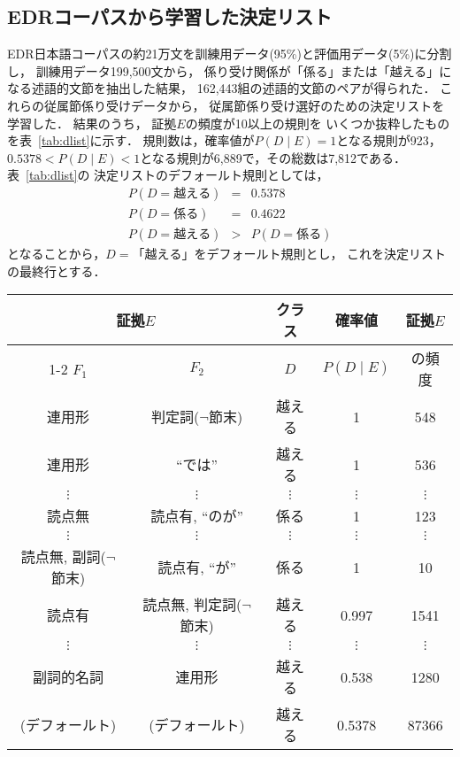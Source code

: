 \subsection{EDRコーパスから学習した決定リスト}

EDR日本語コーパスの約21万文を訓練用データ(95\%)と評価用データ(5\%)に分割し，
訓練用データ199,500文から，
係り受け関係が「係る」または「越える」になる述語的文節を抽\mbox{出した結果}，
162,443組の述語的文節のペアが得られた．
これらの従属節係り受けデータから，
従属節係り受け選好のための決定リストを学習した．
結果のうち，
証拠$E$の頻度が10以上の規則を
いくつか抜粋したものを表~\ref{tab:dlist}に示す．
規則数は，確率値が$P(D\mid E)\!=\!1$となる規則が923，
$0.5378\!<\!P(D\mid E)\!<\!1$となる規則が6,889で，その総数は7,812である．
表~\ref{tab:dlist}の
\mbox{決定リストのデ}フォールト規則としては，
\begin{eqnarray*}
  P(D\!=\!越える) & = & 0.5378 \\
  P(D\!=\!係る) & = & 0.4622 \\
  P(D\!=\!越える) & > & P(D\!=\!係る)
\end{eqnarray*}
となることから，$D\!=\!「越える」$をデフォールト規則とし，
これを決定リストの最終行とする．


\begin{table*}
  \begin{center}
	\caption{EDRコーパスから学習した決定リスト中の規則\\(証拠$E$の頻度10以上)の抜粋}
	\label{tab:dlist}
	\vspace*{.1cm}
\hspace*{-1cm}
    \begin{tabular}[c]{|c|c|c|c|c|}   \hline
	\multicolumn{2}{|c|}{証拠$E$} &	 クラス & 確率値 & 証拠$E$ \\ \cline{1-2}
	$F_1$ & $F_2$ & $D$ & $P(D\mid E)$ & の頻度 \\ \hline\hline
	連用形 & 判定詞($\neg$節末) & 越える & 1 & 548 \\
	連用形 & ``では'' & 越える & 1 & 536 \\
	$\vdots$ & $\vdots$ & $\vdots$ & $\vdots$ & $\vdots$ \\
	読点無 & 読点有, ``のが'' & 係る & 1 & 123 \\	
	$\vdots$ & $\vdots$ & $\vdots$ & $\vdots$ & $\vdots$ \\
	読点無, 副詞($\neg$節末) & 読点有, ``が'' & 係る & 1 & 10 \\
	読点有 & 読点無, 判定詞($\neg$節末) & 越える & 0.997 & 1541 \\
	$\vdots$ & $\vdots$ & $\vdots$ & $\vdots$ & $\vdots$ \\
	副詞的名詞 & 連用形 & 越える & 0.538 & 1280 \\
	(デフォールト)	& (デフォールト) & 越える & 0.5378 & 87366 \\ \hline
    \end{tabular}
  \end{center}
\end{table*}


